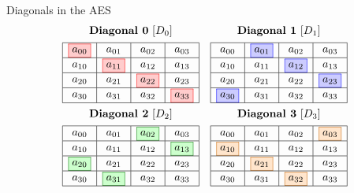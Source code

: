 \documentclass{beamer}
\newenvironment{tres important}[2][]{
	\setkeys{EmphEqEnv}{#2}
	\setkeys{EmphEqOpt}{box={\setlength{\fboxsep}{10pt}\fcolorbox{myNewColorA}{white}},#1}
	\EmphEqMainEnv}
{\endEmphEqMainEnv}
\begin{document}
\begin{frame}{Diagonals in the AES}
  \[
\begin{array}{cc}
\textbf{Diagonal 0}~[D_0] & \textbf{Diagonal 1}~[D_1] \\[1ex]
\begin{array}{|c|c|c|c|}
\hline
\fcolorbox{red}{red!20}{$a_{00}$} & a_{01} & a_{02} & a_{03} \\
\hline
a_{10} & \fcolorbox{red}{red!20}{$a_{11}$} & a_{12} & a_{13} \\
\hline
a_{20} & a_{21} & \fcolorbox{red}{red!20}{$a_{22}$} & a_{23} \\
\hline
a_{30} & a_{31} & a_{32} & \fcolorbox{red}{red!20}{$a_{33}$} \\
\hline
\end{array}
&
\begin{array}{|c|c|c|c|}
\hline
a_{00} & \fcolorbox{blue}{blue!20}{$a_{01}$} & a_{02} & a_{03} \\
\hline
a_{10} & a_{11} & \fcolorbox{blue}{blue!20}{$a_{12}$} & a_{13} \\
\hline
a_{20} & a_{21} & a_{22} & \fcolorbox{blue}{blue!20}{$a_{23}$} \\
\hline
\fcolorbox{blue}{blue!20}{$a_{30}$} & a_{31} & a_{32} & a_{33} \\
\hline
\end{array}
\\[6ex]
\textbf{Diagonal 2}~[D_2] & \textbf{Diagonal 3}~[D_3] \\[1ex]
\begin{array}{|c|c|c|c|}
\hline
a_{00} & a_{01} & \fcolorbox{green!50!black}{green!20}{$a_{02}$} & a_{03} \\
\hline
a_{10} & a_{11} & a_{12} & \fcolorbox{green!50!black}{green!20}{$a_{13}$} \\
\hline
\fcolorbox{green!50!black}{green!20}{$a_{20}$} & a_{21} & a_{22} & a_{23} \\
\hline
a_{30} & \fcolorbox{green!50!black}{green!20}{$a_{31}$} & a_{32} & a_{33} \\
\hline
\end{array}
&
\begin{array}{|c|c|c|c|}
\hline
a_{00} & a_{01} & a_{02} & \fcolorbox{orange!80!black}{orange!20}{$a_{03}$} \\
\hline
\fcolorbox{orange!80!black}{orange!20}{$a_{10}$} & a_{11} & a_{12} & a_{13} \\
\hline
a_{20} & \fcolorbox{orange!80!black}{orange!20}{$a_{21}$} & a_{22} & a_{23} \\
\hline
a_{30} & a_{31} & \fcolorbox{orange!80!black}{orange!20}{$a_{32}$} & a_{33} \\
\hline
\end{array}
\end{array}
\]
  
\end{frame}
\end{document}
